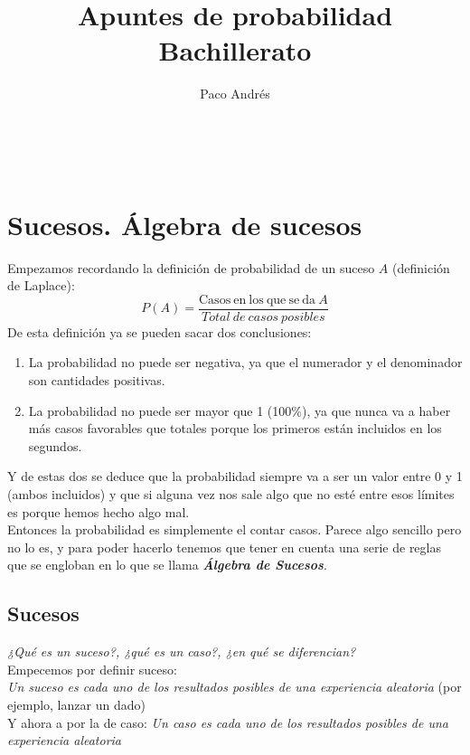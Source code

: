 \documentclass[a4paper,10pt,answers]{exam}
\def \autor{Paco Andrés}
\def \titulo{Apuntes de probabilidad\\Bachillerato}
\begin{document}
\author{\autor}
\title{\titulo}
\date{}
\maketitle

\begin{center}
\doclicenseLongText\\
\vspace{.25cm}
\doclicenseImage
\end{center}

\section{Sucesos. Álgebra de sucesos}
Empezamos recordando la definición de probabilidad de un suceso $A$ (definición de Laplace):
\[
P(A) = \frac{\mathrm{Casos\ en\ los\ que\ se\ da\ }A}{Total\ de\ casos\ posibles}
\]
De esta definición ya se pueden sacar dos conclusiones:
\begin{enumerate}
	\item La probabilidad no puede ser negativa, ya que el numerador y el denominador son cantidades positivas.
	\item La probabilidad no puede ser mayor que 1 (100\%), ya que nunca va a haber más casos favorables que totales porque los primeros están incluidos en los segundos.
\end{enumerate}
Y de estas dos se deduce que la probabilidad siempre va a ser un valor entre 0 y 1 (ambos incluidos) y que si alguna vez nos sale algo que no esté entre esos límites es porque hemos hecho algo mal.\\

Entonces la probabilidad es simplemente el contar casos. Parece algo sencillo pero no lo es, y para poder hacerlo tenemos que tener en cuenta una serie de reglas que se engloban en lo que se llama \textbf{\emph{Álgebra de Sucesos}}.

\subsection{Sucesos}
\emph{¿Qué es un suceso?, ¿qué es un caso?, ¿en qué se diferencian?}\\

Empecemos por definir suceso:\\
\emph{Un suceso es cada uno de los resultados posibles de una experiencia aleatoria} (por ejemplo, lanzar un dado)\\

Y ahora a por la de caso:
\emph{Un caso es cada uno de los resultados posibles de una experiencia aleatoria}\\
\end{document}
